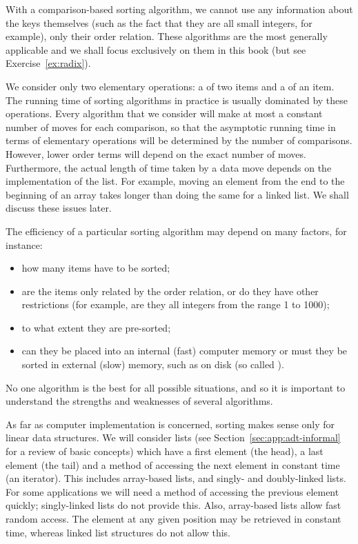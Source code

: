 With a comparison-based sorting algorithm, we cannot use any 
information about the keys themselves (such as the fact that they are all 
small integers, for example), only their order relation. These algorithms
are the most generally applicable and we shall focus exclusively 
on them in this book (but see Exercise~\ref{ex:radix}). 

We consider only two elementary 
operations: a  of two items 
and a  of an item. The running time of sorting algorithms in practice 
 is usually dominated by these operations. Every algorithm that we consider will make at 
most a constant number of moves for each comparison, so that the asymptotic 
running time in terms of elementary operations will be determined by the 
number of comparisons. However, lower order terms will depend on the exact number
of moves. Furthermore, the actual length of time taken by a data move depends 
on the implementation of the list. For example, moving an element from the 
end to the beginning of an array takes longer than doing the same for a linked 
list. We shall discuss these issues later.

The efficiency of a particular sorting algorithm may depend on many factors, 
for instance:

\begin{itemize}
\item how many items have to be sorted;
\item are the items only related by the order relation, or do they have other 
restrictions (for example, are they all integers from the range 1 to 1000);
\item to what extent they are pre-sorted;
\item can they be placed into an internal (fast) computer memory or must they be
sorted in external (slow) memory, such as on disk (so called 
).
\end{itemize}

No one algorithm is the best for all possible situations, and so it is important
to understand the strengths and weaknesses of several algorithms.

As far as computer implementation is concerned, sorting makes sense only for 
linear data structures. We will consider lists (see Section~\ref{sec:app:adt-informal} 
for a review of basic concepts) which have a first element (the head), a last 
element (the tail) and a method of accessing the next element in constant time 
(an iterator). This includes array-based lists, and singly- and doubly-linked 
lists. For some applications we will need a method of accessing the previous 
element quickly; singly-linked lists do not provide this. Also, array-based 
lists allow fast random access. The element at any given position may be 
retrieved in constant time, whereas linked list structures do not allow this. 

